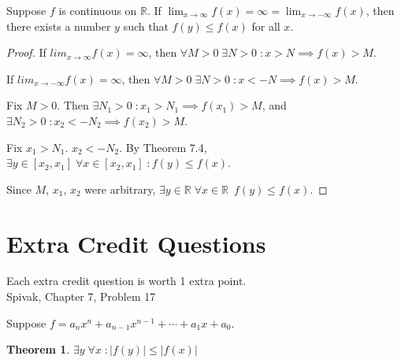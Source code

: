 \documentclass{article} %
\theoremstyle{plain}
\newtheorem*{theorem*}{Theorem}
\theoremstyle{definition}
\newcommand{\Rb}{\mathbb{R}}
\begin{document}
\noindent{} Suppose $f$ is continuous on $\Rb$. If $\displaystyle \lim_{x \rightarrow\infty} f(x) = \infty = \lim_{x \rightarrow -\infty} f(x)$, then there exists a number $y$ such that $f(y) \leq f(x)$ for all $x$. 


\begin{proof} 
    If $lim_{x \to \infty} f(x) = \infty$, then $\forall M > 0 \; \exists N > 0 \; \colon x > N \implies f(x) > M$.

    If $lim_{x \to -\infty} f(x) = \infty$, then $\forall M > 0 \; \exists N > 0 \; \colon x < -N \implies f(x) > M$.

    Fix $M > 0$.  Then $\exists N_1 > 0 \; \colon x_1 > N_1 \implies f(x_1) > M$, and $\exists N_2 > 0 \; \colon x_2 < -N_2 \implies f(x_2) > M$.

    Fix $x_1 > N_1$. $x_2 < -N_2$.  By Theorem 7.4, $\exists y \in [x_2, x_1] \; \forall x \in [x_2, x_1] \; \colon f(y) \leq f(x)$.

    Since $M$, $x_1$, $x_2$ were arbitrary, $\exists y \in \mathbb{R} \; \forall x \in \mathbb{R} \; \: f(y) \leq f(x)$.

\end{proof} 

\section{Extra Credit Questions} 

Each extra credit question is worth 1 extra point. \\

\noindent{} Spivak, Chapter 7, Problem 17

Suppose $f = a_n x^n + a_{n-1} x^{n-1} + \cdots + a_1 x + a_0$.

\begin{theorem*} $\exists y \; \forall x \; \colon |f(y)| \leq |f(x)|$
\end{theorem*}
\end{document}
